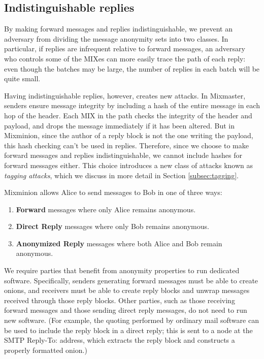 \documentclass{llncs}
\begin{document}
\subsection{Indistinguishable replies}
\label{subsec:header-swap}

By making forward messages and replies indistinguishable, we prevent an adversary
from dividing the message anonymity sets into two classes. In particular,
if replies are infrequent relative to forward messages, an adversary who controls
some of the MIXes can more easily trace the path of each reply:  even
though the batches may be large, the number of replies in each batch
will be quite small.

Having indistinguishable replies, however, creates new attacks.  In
Mixmaster, senders ensure message integrity by including a hash of
the entire message in each hop of the header.  Each MIX in the path
checks the integrity of the header and payload, and drops the message
immediately if it has been altered.  But in Mixminion, since the
author of a reply block is not the one writing the payload, this
hash checking can't be used in replies. Therefore, since we choose to make
forward messages and replies indistinguishable, we cannot include
hashes for forward messages either. This choice introduces a new class
of attacks known as \emph{tagging attacks}, which we discuss in more
detail in Section \ref{subsec:tagging}.

Mixminion allows Alice to send messages to Bob in one of three ways:

\begin{enumerate}
\item \textbf{Forward} messages where only Alice remains anonymous.
\item \textbf{Direct Reply} messages where only Bob remains anonymous.
\item \textbf{Anonymized Reply} messages where both Alice and Bob
   remain anonymous.
\end{enumerate}

We require parties that benefit from anonymity properties to run dedicated
software.  Specifically, senders generating forward messages must be able
to create onions, and receivers must be able to create reply blocks
and unwrap messages received through those reply blocks. Other parties,
such as those receiving forward messages and those sending direct reply
messages, do not need to run new software. (For example, the quoting
performed by ordinary mail software can be used to include the reply
block in a direct reply; this is sent to a node at the SMTP Reply-To:
address, which extracts the reply block and constructs a properly
formatted onion.)
\end{document}
